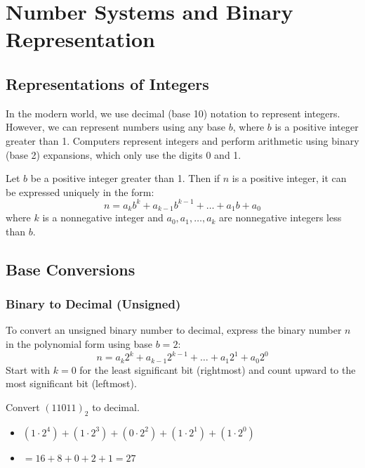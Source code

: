 \chapter{Number Systems and Binary Representation}

\section{Representations of Integers}
In the modern world, we use decimal (base 10) notation to represent integers. However, we can represent numbers using any base $b$, where $b$ is a positive integer greater than 1. Computers represent integers and perform arithmetic using binary (base 2) expansions, which only use the digits 0 and 1.

\begin{theorem}
Let $b$ be a positive integer greater than 1. Then if $n$ is a positive integer, it can be expressed uniquely in the form:
\[ n = a_k b^k + a_{k-1} b^{k-1} + \dots + a_1 b + a_0 \]
where $k$ is a nonnegative integer and $a_0, a_1, \dots, a_k$ are nonnegative integers less than $b$.
\end{theorem}

\section{Base Conversions}

\subsection{Binary to Decimal (Unsigned)}
To convert an unsigned binary number to decimal, express the binary number $n$ in the polynomial form using base $b=2$:
\[ n = a_k 2^k + a_{k-1} 2^{k-1} + \dots + a_1 2^1 + a_0 2^0 \]
Start with $k=0$ for the least significant bit (rightmost) and count upward to the most significant bit (leftmost).

\begin{example}
Convert $(11011)_2$ to decimal.
\begin{itemize}
    \item $(1 \cdot 2^4) + (1 \cdot 2^3) + (0 \cdot 2^2) + (1 \cdot 2^1) + (1 \cdot 2^0)$
    \item $= 16 + 8 + 0 + 2 + 1 = 27$
\end{itemize}
\end{example}

